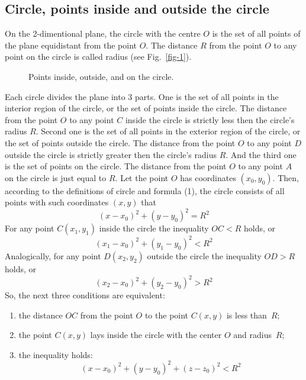 \documentclass{article}
\begin{document}
\subsection{Circle, points inside and outside the circle} %

On the 2-dimentional plane, the circle with the centre $O$ is the set of all points of the plane equidistant from the point $O$.
The distance $R$ from the point $O$ to any point on the circle is called radius (see Fig.~\ref{fig-1}).
\begin{figure}
  \centering
  \def\svgwidth{200bp}
  
\caption{Points inside, outside, and on the circle.}
\label{fig-4}
\end{figure}
%
Each circle divides the plane into 3 parts.
One is the set of all points in the interior region of the circle, or the set of points inside the circle.
The distance from the point $O$ to any point $C$ inside the circle is strictly less then the circle’s radius $R$.
Second one is the set of all points in the exterior region of the circle, or the set of points outside the circle.
The distance from the point $O$ to any point $D$ outside the circle is strictly greater then the circle’s radius $R$.
And the third one is the set of points on the circle.
The distance from the point $O$ to any point $A$ on the circle is just equal to $R$.
Let the point $O$ has coordinates $(x_0, y_0)$.
Then, according to the definitions of circle and formula (1), the circle consists of all points with such coordinates $(x, y)$ that
\begin{equation}
  (x - x_0)^2 + (y - y_0)^2 = R^2
\end{equation}
For any point $C(x_1, y_1)$ inside the circle the inequality $OC < R$ holds, or
\begin{equation}
  (x_1 - x_0)^2 + (y_1 - y_0)^2 < R^2
\end{equation}
Analogically, for any point $D(x_2, y_2)$ outside the circle the inequality $OD > R$ holds, or
\begin{equation}
  (x_2 - x_0)^2 + (y_2 - y_0)^2 > R^2
\end{equation}
So, the next three conditions are equivalent:
\begin{enumerate}
\item
the distance $OC$ from the point $O$ to the point $C(x, y)$ is less than~$R$;
\item
the point $C(x, y)$ lays inside the circle with the center $O$ and radius~$R$;
\item
the inequality holds:
\begin{equation}
  (x - x_0)^2 + (y - y_0)^2 + (z - z_0)^2 < R^2
\end{equation}
\end{enumerate}
\end{document}
